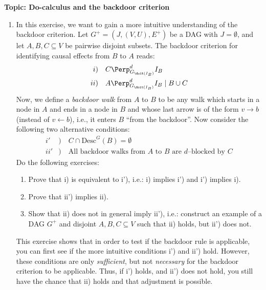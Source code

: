 

\flushleft\textbf{Topic: Do-calculus and the backdoor criterion}

\begin{enumerate}
  \item %
  In this exercise, we want to gain a more intuitive understanding of the backdoor criterion.
  Let $G^{+} = (J, (V, U), E^{+})$ be a DAG with $J = \emptyset$, and let $A, B, C \subseteq V$ be pairwise disjoint subsets.
  The backdoor criterion for identifying causal effects from $B$ to $A$ reads:
  \begin{align*}
    i  & )  \quad   C    \Perp^d_{G_{\doit(I_B)}} I_B                \\
    ii & )  \quad    A    \Perp^d_{G_{\doit(I_B)}} I_B \mid B \cup C
  \end{align*}
  Now, we define a \emph{backdoor walk} from $A$ to $B$ to be any walk which starts in a node in $A$ and ends in a node in $B$ and whose last arrow is of the form $v \rightarrow b$ (instead of $v \leftarrow b$), i.e., it enters $B$ ``from the backdoor''.
  Now consider the following two alternative conditions:
  \begin{align*}
    i'  & ) \quad   C \cap \text{Desc}^G(B) = \emptyset                           \\
    ii' & ) \quad   \text{All backdoor walks from $A$ to $B$ are $d$--blocked by $C$}
  \end{align*}
  Do the following exercises:
  \begin{enumerate}
    \item Prove that i) is equivalent to i'), i.e.: i) implies i') and i') implies i).
    \item Prove that ii') implies ii).
    \item Show that ii) does not in general imply ii'), i.e.: construct an example of a DAG $G^+$ and disjoint $A, B, C \subseteq V$ such that ii) holds, but ii') does not.
  \end{enumerate}
  This exercise shows that in order to test if the backdoor rule is applicable, you can first see if the more intuitive conditions i') and ii') hold.
  However, these conditions are only \emph{sufficient}, but not \emph{necessary} for the backdoor criterion to be applicable.
  Thus, if i') holds, and ii') does not hold, you still have the chance that ii) holds and that adjustment is possible.



\end{enumerate}
